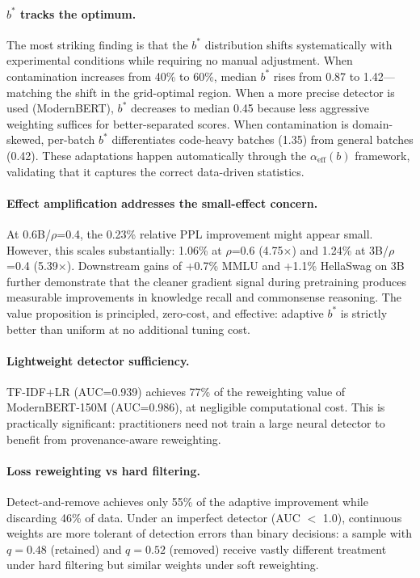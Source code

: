 \documentclass[11pt]{article}
\begin{document}
\paragraph{$b^*$ tracks the optimum.}
The most striking finding is that the $b^*$ distribution shifts systematically with experimental conditions while requiring no manual adjustment. When contamination increases from 40\% to 60\%, median $b^*$ rises from 0.87 to 1.42---matching the shift in the grid-optimal region. When a more precise detector is used (ModernBERT), $b^*$ decreases to median 0.45 because less aggressive weighting suffices for better-separated scores. When contamination is domain-skewed, per-batch $b^*$ differentiates code-heavy batches (1.35) from general batches (0.42). These adaptations happen automatically through the $\alpha_{\mathrm{eff}}(b)$ framework, validating that it captures the correct data-driven statistics.

\paragraph{Effect amplification addresses the small-effect concern.}
At 0.6B/$\rho$=0.4, the 0.23\% relative PPL improvement might appear small. However, this scales substantially: 1.06\% at $\rho$=0.6 (4.75$\times$) and 1.24\% at 3B/$\rho$=0.4 (5.39$\times$). Downstream gains of +0.7\% MMLU and +1.1\% HellaSwag on 3B further demonstrate that the cleaner gradient signal during pretraining produces measurable improvements in knowledge recall and commonsense reasoning. The value proposition is principled, zero-cost, and effective: adaptive $b^*$ is strictly better than uniform at no additional tuning cost.

\paragraph{Lightweight detector sufficiency.}
TF-IDF+LR (AUC=0.939) achieves 77\% of the reweighting value of ModernBERT-150M (AUC=0.986), at negligible computational cost. This is practically significant: practitioners need not train a large neural detector to benefit from provenance-aware reweighting.

\paragraph{Loss reweighting vs hard filtering.}
Detect-and-remove achieves only 55\% of the adaptive improvement while discarding 46\% of data. Under an imperfect detector (AUC $<$ 1.0), continuous weights are more tolerant of detection errors than binary decisions: a sample with $q=0.48$ (retained) and $q=0.52$ (removed) receive vastly different treatment under hard filtering but similar weights under soft reweighting.
\end{document}
